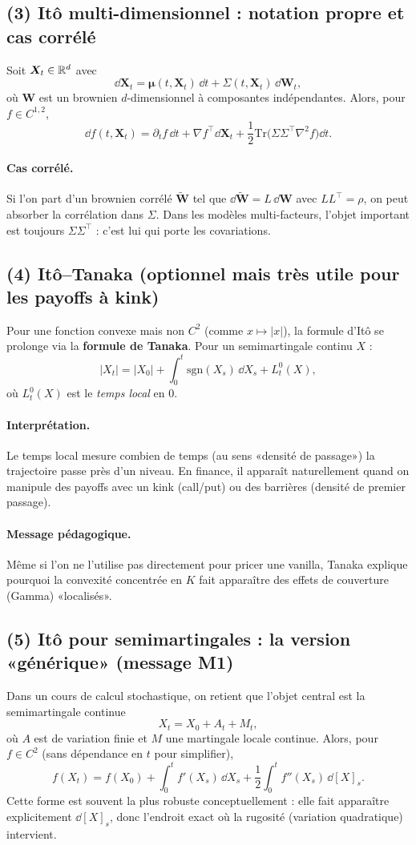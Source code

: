 \subsection*{(3) Itô multi-dimensionnel : notation propre et cas corrélé}
Soit $\bm{X}_t\in\mathbb{R}^d$ avec
\[
\dd \bm{X}_t=\bm{\mu}(t,\bm{X}_t)\,\dd t+\Sigma(t,\bm{X}_t)\,\dd \bm{W}_t,
\]
où $\bm{W}$ est un brownien $d$-dimensionnel à composantes indépendantes.
Alors, pour $f\in C^{1,2}$,
\[
\dd f(t,\bm{X}_t)
=\partial_t f\,\dd t+\nabla f^\top \dd \bm{X}_t+\frac12\mathrm{Tr}\!\big(\Sigma\Sigma^\top \nabla^2 f\big)\dd t.
\]
\paragraph{Cas corrélé.}
Si l'on part d'un brownien corrélé $\bm{\widetilde W}$ tel que $\dd \bm{\widetilde W}=L\,\dd \bm{W}$ avec $LL^\top=\rho$, on peut absorber la corrélation dans $\Sigma$.
Dans les modèles multi-facteurs, l'objet important est toujours $\Sigma\Sigma^\top$ : c'est lui qui porte les covariations.

\subsection*{(4) Itô--Tanaka (optionnel mais très utile pour les payoffs à kink)}
Pour une fonction convexe mais non $C^2$ (comme $x\mapsto |x|$), la formule d'Itô se prolonge via la \textbf{formule de Tanaka}.
Pour un semimartingale continu $X$ :
\[
|X_t|
=|X_0|+\int_0^t \mathrm{sgn}(X_s)\,\dd X_s + L_t^0(X),
\]
où $L_t^0(X)$ est le \emph{temps local} en 0.
\paragraph{Interprétation.}
Le temps local mesure combien de temps (au sens «densité de passage») la trajectoire passe près d'un niveau.
En finance, il apparaît naturellement quand on manipule des payoffs avec un kink (call/put) ou des barrières (densité de premier passage).
\paragraph{Message pédagogique.}
Même si l'on ne l'utilise pas directement pour pricer une vanilla, Tanaka explique pourquoi la convexité concentrée en $K$ fait apparaître des effets de couverture (Gamma) «localisés».

\subsection*{(5) Itô pour semimartingales : la version «générique» (message M1)}
Dans un cours de calcul stochastique, on retient que l'objet central est la semimartingale continue
\[
X_t=X_0+A_t+M_t,
\]
où $A$ est de variation finie et $M$ une martingale locale continue.
Alors, pour $f\in C^2$ (sans dépendance en $t$ pour simplifier),
\[
f(X_t)=f(X_0)+\int_0^t f'(X_s)\,\dd X_s+\frac12\int_0^t f''(X_s)\,\dd [X]_s.
\]
Cette forme est souvent la plus robuste conceptuellement : elle fait apparaître explicitement $\dd[X]_s$, donc l'endroit exact où la rugosité (variation quadratique) intervient.
